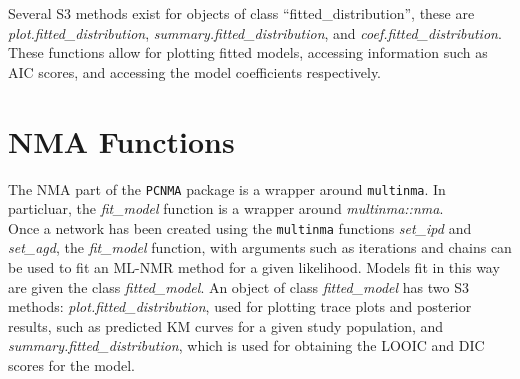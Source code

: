 Several S3 methods exist for objects of class ``fitted\_distribution'', these are \textit{plot.fitted\_distribution}, \textit{summary.fitted\_distribution}, and \textit{coef.fitted\_distribution}. These functions allow for plotting fitted models, accessing information such as AIC scores, and accessing the model coefficients respectively.

\section{NMA Functions}
The NMA part of the \verb|PCNMA| package is a wrapper around \verb|multinma|. In particluar, the \textit{fit\_model} function is a wrapper around \textit{multinma::nma}. \\

Once a network has been created using the \verb|multinma| functions \textit{set\_ipd} and \textit{set\_agd}, the \textit{fit\_model} function, with arguments such as iterations and chains can be used to fit an ML-NMR method for a given likelihood. Models fit in this way are given the class \textit{fitted\_model}. An object of class \textit{fitted\_model} has two S3 methods: \textit{plot.fitted\_distribution}, used for plotting trace plots and posterior results, such as predicted KM curves for a given study population, and \textit{summary.fitted\_distribution}, which is used for obtaining the LOOIC and DIC scores for the model. \\

